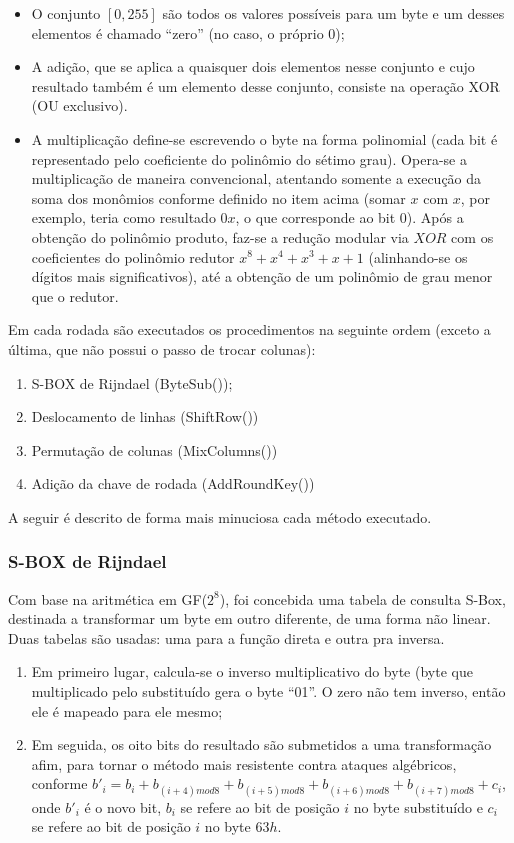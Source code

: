 \begin{itemize}
\item O conjunto $[0,255]$ são todos os valores possíveis para um byte e um desses elementos é chamado ``zero'' (no caso, o próprio $0$);
\item A adição, que se aplica a quaisquer dois elementos nesse conjunto e cujo resultado também é um elemento desse conjunto, consiste na operação XOR (OU exclusivo). 
\item A multiplicação define-se escrevendo o byte na forma polinomial (cada bit é representado pelo coeficiente do polinômio do sétimo grau). Opera-se a multiplicação de maneira convencional, atentando somente a execução da soma dos monômios conforme definido no item acima (somar $x$ com $x$, por exemplo, teria como resultado $0x$, o que corresponde ao bit $0$). Após a obtenção do polinômio produto, faz-se a redução modular via $XOR$ com os coeficientes do polinômio redutor $x^{8}+x^{4}+x^{3}+x+1$ (alinhando-se os dígitos mais significativos), até a obtenção de um polinômio de grau menor que o redutor.
\end{itemize}

Em cada rodada são executados os procedimentos na seguinte ordem (exceto a última, que não possui o passo de trocar colunas):
\begin{enumerate}
\item S-BOX de Rijndael (ByteSub());
\item Deslocamento de linhas (ShiftRow())
\item Permutação de colunas (MixColumns())
\item Adição da chave de rodada (AddRoundKey())
\end{enumerate}

A seguir é descrito de forma mais minuciosa cada método executado.

\subsubsection{S-BOX de Rijndael}

Com base na aritmética em GF($2^{8}$), foi concebida uma tabela de consulta S-Box, destinada a transformar um byte em outro diferente, de uma forma não linear. Duas tabelas são usadas: uma para a função direta e outra pra inversa.
\begin{enumerate}
\item Em primeiro lugar, calcula-se o inverso multiplicativo do byte (byte que multiplicado pelo substituído gera o byte ``01''. O zero não tem inverso, então ele é mapeado para ele mesmo;
\item Em seguida, os oito bits do resultado são submetidos a uma transformação afim, para tornar o método mais resistente contra ataques algébricos, conforme $b'_{i}=b_{i}+b_{(i+4)mod 8}+b_{(i+5)mod 8}+b_{(i+6)mod 8}+b_{(i+7)mod 8}+c_{i}$, onde $b'_{i}$ é o novo bit, $b_{i}$ se refere ao bit de posição $i$ no byte substituído e $c_{i}$ se refere ao bit de posição $i$ no byte $63h$.
\end{enumerate}

